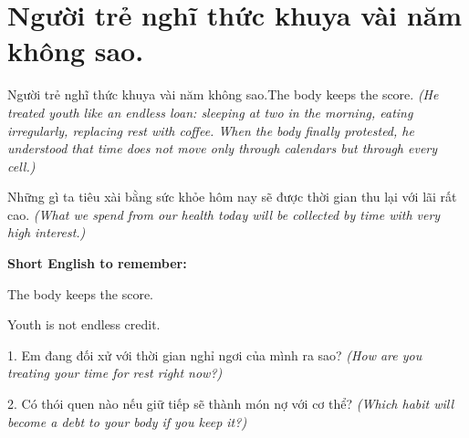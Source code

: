\section{Người trẻ nghĩ thức khuya vài năm không sao.}
\begin{truyen}{Người trẻ nghĩ thức khuya vài năm không sao.}{The body keeps the score.}
\textit{(He treated youth like an endless loan: sleeping at two in the morning, eating irregularly, replacing rest with coffee. When the body finally protested, he understood that time does not move only through calendars but through every cell.)}
\end{truyen}
\begin{baihoc}
Những gì ta tiêu xài bằng sức khỏe hôm nay sẽ được thời gian thu lại với lãi rất cao.
\textit{(What we spend from our health today will be collected by time with very high interest.)}
\end{baihoc}
\begin{ghinhoanh}
\textbf{Short English to remember:}

The body keeps the score.

Youth is not endless credit.
\end{ghinhoanh}
\begin{tuhocnhanh}
1. Em đang đối xử với thời gian nghỉ ngơi của mình ra sao? \textit{(How are you treating your time for rest right now?)}

2. Có thói quen nào nếu giữ tiếp sẽ thành món nợ với cơ thể? \textit{(Which habit will become a debt to your body if you keep it?)}
\end{tuhocnhanh}
\ngancach

